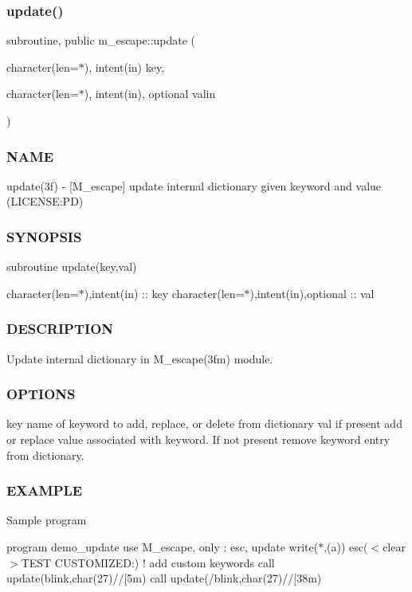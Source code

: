\subsubsection{\texorpdfstring{update()}{update()}}
{\footnotesize\ttfamily subroutine, public m\+\_\+escape\+::update (\begin{DoxyParamCaption}\item[{character(len=$\ast$), intent(in)}]{key,  }\item[{character(len=$\ast$), intent(in), optional}]{valin }\end{DoxyParamCaption})}



\subsubsection*{N\+A\+ME}

update(3f) -\/ \mbox{[}M\+\_\+escape\mbox{]} update internal dictionary given keyword and value (L\+I\+C\+E\+N\+SE\+:PD) 

\subsubsection*{S\+Y\+N\+O\+P\+S\+IS}

subroutine update(key,val)

character(len=$\ast$),intent(in) \+:\+: key character(len=$\ast$),intent(in),optional \+:\+: val

\subsubsection*{D\+E\+S\+C\+R\+I\+P\+T\+I\+ON}

Update internal dictionary in M\+\_\+escape(3fm) module.

\subsubsection*{O\+P\+T\+I\+O\+NS}

key name of keyword to add, replace, or delete from dictionary val if present add or replace value associated with keyword. If not present remove keyword entry from dictionary. \subsubsection*{E\+X\+A\+M\+P\+LE}

Sample program

program demo\+\_\+update use M\+\_\+escape, only \+: esc, update write($\ast$,\textquotesingle{}(a)\textquotesingle{}) esc(\textquotesingle{}$<$clear$>$T\+E\+ST C\+U\+S\+T\+O\+M\+I\+Z\+ED\+:\textquotesingle{}) ! add custom keywords call update(\textquotesingle{}blink\textquotesingle{},char(27)//\textquotesingle{}\mbox{[}5m\textquotesingle{}) call update(\textquotesingle{}/blink\textquotesingle{},char(27)//\textquotesingle{}\mbox{[}38m\textquotesingle{})

